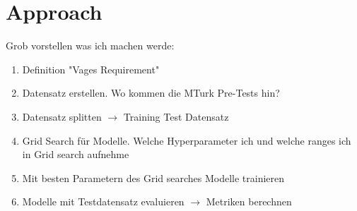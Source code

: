 \chapter{Approach}
\label{chp:approach}

Grob vorstellen was ich machen werde:

\begin{enumerate}
    \item Definition "Vages Requirement"
    \item Datensatz erstellen. Wo kommen die MTurk Pre-Tests hin?
    \item Datensatz splitten $\rightarrow$ Training Test Datensatz
    \item Grid Search für Modelle. Welche Hyperparameter ich und welche ranges ich in Grid search aufnehme
    \item Mit besten Parametern des Grid searches Modelle trainieren
    \item Modelle mit Testdatensatz evaluieren $\rightarrow$ Metriken berechnen
\end{enumerate}
